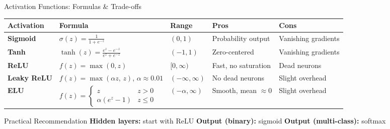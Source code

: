 \documentclass[aspectratio=169]{beamer}
\begin{document}
\begin{frame}{Activation Functions: Formulas \& Trade-offs}

\small
\begin{tabular}{@{}lllll@{}}
\toprule
\textbf{Activation} & \textbf{Formula} & \textbf{Range} & \textbf{Pros} & \textbf{Cons} \\
\midrule
\textbf{Sigmoid} & $\sigma(z) = \tfrac{1}{1+e^{-z}}$ & $(0,1)$ & Probability output & Vanishing gradients \\[4pt]
\textbf{Tanh} & $\tanh(z) = \tfrac{e^z - e^{-z}}{e^z + e^{-z}}$ & $(-1,1)$ & Zero-centered & Vanishing gradients \\[4pt]
\textbf{ReLU} & $f(z) = \max(0,z)$ & $[0,\infty)$ & Fast, no saturation & Dead neurons \\[4pt]
\textbf{Leaky ReLU} & $f(z) = \max(\alpha z,\, z)$, $\alpha{\approx}0.01$ & $(-\infty,\infty)$ & No dead neurons & Slight overhead \\[4pt]
\textbf{ELU} & $f(z) = \begin{cases} z & z{>}0 \\ \alpha(e^z{-}1) & z{\le}0 \end{cases}$ & $(-\alpha,\infty)$ & Smooth, mean $\approx 0$ & Slight overhead \\
\bottomrule
\end{tabular}

\vspace{0.4cm}
\begin{block}{Practical Recommendation}
\textbf{Hidden layers:} start with ReLU \quad
\textbf{Output (binary):} sigmoid \quad
\textbf{Output (multi-class):} softmax
\end{block}
\end{frame}
\end{document}
